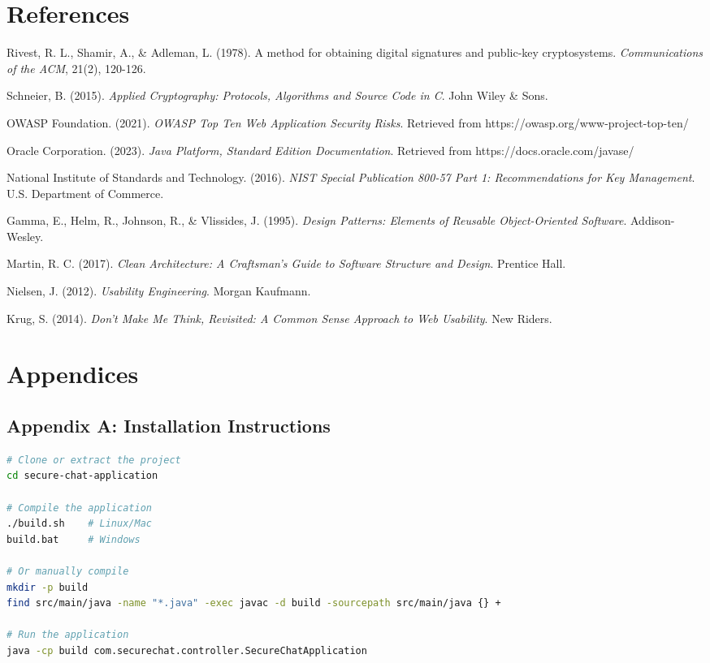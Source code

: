 \documentclass[12pt,a4paper]{article}
\begin{document}
\section{References}

\begin{thebibliography}{9}

Rivest, R. L., Shamir, A., \& Adleman, L. (1978). A method for obtaining digital signatures and public-key cryptosystems. \textit{Communications of the ACM}, 21(2), 120-126.

Schneier, B. (2015). \textit{Applied Cryptography: Protocols, Algorithms and Source Code in C}. John Wiley \& Sons.

OWASP Foundation. (2021). \textit{OWASP Top Ten Web Application Security Risks}. Retrieved from https://owasp.org/www-project-top-ten/

Oracle Corporation. (2023). \textit{Java Platform, Standard Edition Documentation}. Retrieved from https://docs.oracle.com/javase/

National Institute of Standards and Technology. (2016). \textit{NIST Special Publication 800-57 Part 1: Recommendations for Key Management}. U.S. Department of Commerce.

Gamma, E., Helm, R., Johnson, R., \& Vlissides, J. (1995). \textit{Design Patterns: Elements of Reusable Object-Oriented Software}. Addison-Wesley.

Martin, R. C. (2017). \textit{Clean Architecture: A Craftsman's Guide to Software Structure and Design}. Prentice Hall.

Nielsen, J. (2012). \textit{Usability Engineering}. Morgan Kaufmann.

Krug, S. (2014). \textit{Don't Make Me Think, Revisited: A Common Sense Approach to Web Usability}. New Riders.

\end{thebibliography}

\newpage

\section{Appendices}

\subsection{Appendix A: Installation Instructions}
\begin{lstlisting}[language=bash, caption=Installation Commands]
# Clone or extract the project
cd secure-chat-application

# Compile the application
./build.sh    # Linux/Mac
build.bat     # Windows

# Or manually compile
mkdir -p build
find src/main/java -name "*.java" -exec javac -d build -sourcepath src/main/java {} +

# Run the application
java -cp build com.securechat.controller.SecureChatApplication
\end{lstlisting}
\end{document}
